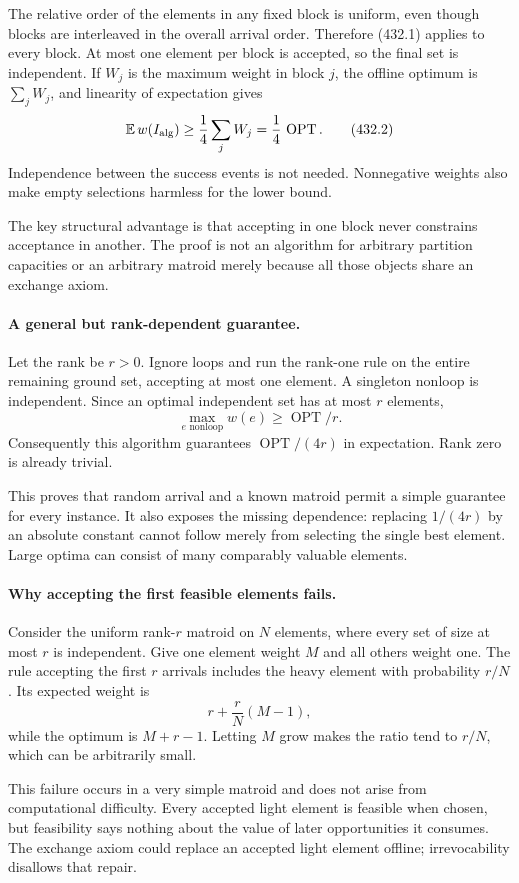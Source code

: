 \documentclass[11pt]{article}
\begin{document}
The relative order of the elements in any fixed block is uniform, even though blocks are interleaved in the overall arrival order. Therefore (432.1) applies to every block. At most one element per block is accepted, so the final set is independent. If $W_j$ is the maximum weight in block $j$, the offline optimum is $\sum_j W_j$, and linearity of expectation gives
\[
 \mathbb E\,w(I_{\rm alg})\ge\frac14\sum_jW_j
       =\frac14\,\operatorname{OPT}.
 \tag{432.2}
\]
Independence between the success events is not needed. Nonnegative weights also make empty selections harmless for the lower bound.

The key structural advantage is that accepting in one block never constrains acceptance in another. The proof is not an algorithm for arbitrary partition capacities or an arbitrary matroid merely because all those objects share an exchange axiom.

\paragraph{A general but rank-dependent guarantee.}
Let the rank be $r>0$. Ignore loops and run the rank-one rule on the entire remaining ground set, accepting at most one element. A singleton nonloop is independent. Since an optimal independent set has at most $r$ elements,
\[
 \max_{e\text{ nonloop}}w(e)\ge\operatorname{OPT}/r.
\]
Consequently this algorithm guarantees $\operatorname{OPT}/(4r)$ in expectation. Rank zero is already trivial.

This proves that random arrival and a known matroid permit a simple guarantee for every instance. It also exposes the missing dependence: replacing $1/(4r)$ by an absolute constant cannot follow merely from selecting the single best element. Large optima can consist of many comparably valuable elements.

\paragraph{Why accepting the first feasible elements fails.}
Consider the uniform rank-$r$ matroid on $N$ elements, where every set of size at most $r$ is independent. Give one element weight $M$ and all others weight one. The rule accepting the first $r$ arrivals includes the heavy element with probability $r/N$. Its expected weight is
\[
 r+\frac rN(M-1),
\]
while the optimum is $M+r-1$. Letting $M$ grow makes the ratio tend to $r/N$, which can be arbitrarily small.

This failure occurs in a very simple matroid and does not arise from computational difficulty. Every accepted light element is feasible when chosen, but feasibility says nothing about the value of later opportunities it consumes. The exchange axiom could replace an accepted light element offline; irrevocability disallows that repair.
\end{document}
